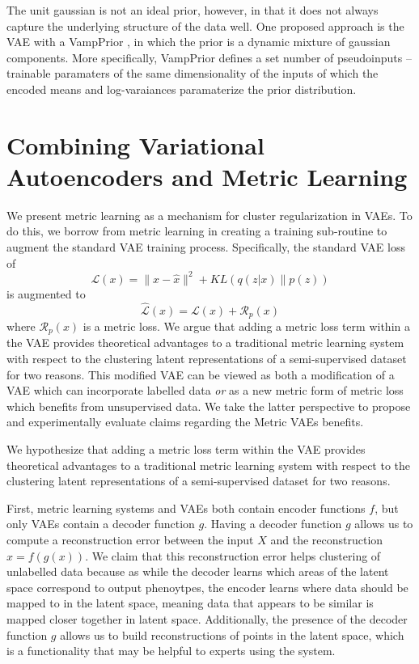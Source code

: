 \documentclass[./dissertation.tex]{subfiles}
\begin{document}
    The unit gaussian is not an ideal prior, however, in that it does not always capture the underlying structure of the data well. One proposed approach is the VAE with a VampPrior \cite{}, in which the prior is a dynamic mixture of gaussian components. More specifically, VampPrior defines a set number of pseudoinputs -- trainable paramaters of the same dimensionality of the inputs of which the encoded means and log-varaiances paramaterize the prior distribution. 

    \section{Combining Variational Autoencoders and Metric Learning}
    We present metric learning as a mechanism for cluster regularization in VAEs. To do this, we borrow from metric learning in creating a training sub-routine to augment the standard VAE training process. Specifically, the standard VAE loss of 
    \begin{equation*}
    \mathcal L(x)=\|x-\hat x\|^2+KL(q(z|x)\|p(z))    
    \end{equation*}
    is augmented to 
    \begin{equation*}
    \hat{\mathcal L}(x)=\mathcal{L}(x)+\mathcal{R}_p(x)    
    \end{equation*}
    where $\mathcal{R}_p(x)$ is a metric loss. We argue that adding a metric loss term within a the VAE provides theoretical advantages to a traditional metric learning system with respect to the clustering latent representations of a semi-supervised dataset for two reasons. This modified VAE can be viewed as both a modification of a VAE which can incorporate labelled data \emph{or} as a new metric form of metric loss which benefits from unsupervised data. We take the latter perspective to propose and experimentally evaluate claims regarding the Metric VAEs benefits.
    
    We hypothesize that adding a metric loss term within the VAE provides theoretical advantages to a traditional metric learning system with respect to the clustering latent representations of a semi-supervised dataset for two reasons. 

    First, metric learning systems and VAEs both contain encoder functions $f$, but only VAEs contain a decoder function $g$. Having a decoder function $g$ allows us to compute a reconstruction error between the input $X$ and the reconstruction $\hat x=f(g(x))$. We claim that this reconstruction error helps clustering of unlabelled data because as while the decoder learns which areas of the latent space correspond to output phenoytpes, the encoder learns where data should be mapped to in the latent space, meaning data that appears to be similar is mapped closer together in latent space. Additionally, the presence of the decoder function $g$ allows us to build reconstructions of points in the latent space, which is a functionality that may be helpful to experts using the system.
    
\end{document}
